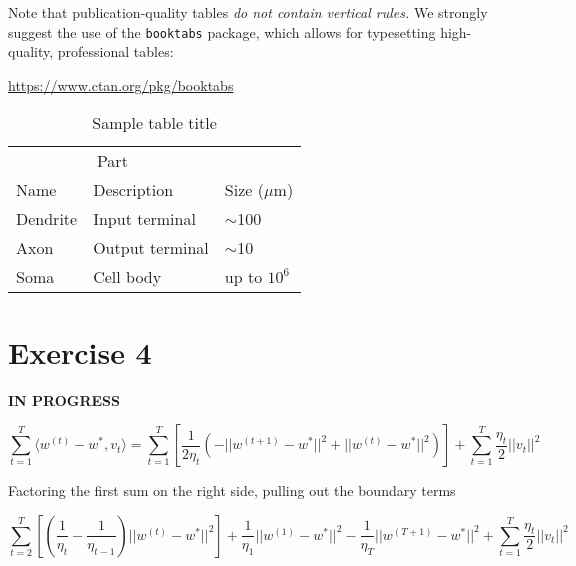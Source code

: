 \documentclass{article}
\begin{document}
Note that publication-quality tables \emph{do not contain vertical rules.} We
strongly suggest the use of the \verb+booktabs+ package, which allows for
typesetting high-quality, professional tables:
\begin{center}
  \url{https://www.ctan.org/pkg/booktabs}
\end{center}

\begin{table}
  \caption{Sample table title}
  \label{sample-table}
  \centering
  \begin{tabular}{lll}
    \toprule
    \multicolumn{2}{c}{Part}                   \\
    \cmidrule(r){1-2}
    Name     & Description     & Size ($\mu$m) \\
    \midrule
    Dendrite & Input terminal  & $\sim$100     \\
    Axon     & Output terminal & $\sim$10      \\
    Soma     & Cell body       & up to $10^6$  \\
    \bottomrule
  \end{tabular}
\end{table}

\section{Exercise 4}
\textbf{IN PROGRESS}





\[\sum_{t=1}^T\langle w^{(t)} - w^*, v_t \rangle = \sum_{t=1}^T\left[\frac{1}{2\eta_t} \left(-||w^{(t+1)} - w^*||^2 + ||w^{(t)} - w^*||^2  \right) \right] + \sum_{t=1}^T \frac{\eta_t}{2} ||v_t||^2\]

Factoring the first sum on the right side, pulling out the boundary
terms

\[
\sum_{t=2}^T\left[\left(\frac{1}{\eta_t} - \frac{1}{\eta_{t-1}}\right) ||w^{(t)} - w^*||^2   \right]  + \frac{1}{\eta_1}||w^{(1)} - w^*||^2 - \frac{1}{\eta_T}||w^{(T+1)} - w^*||^2 + \sum_{t=1}^T \frac{\eta_t}{2} ||v_t||^2
\]
\end{document}
